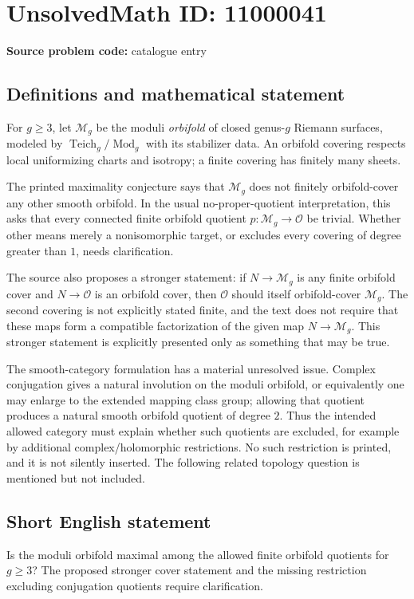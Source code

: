 \documentclass[11pt]{article}
\begin{document}
\section*{UnsolvedMath ID: 11000041}
\textbf{Source problem code:} catalogue entry
\subsection{Definitions and mathematical statement}
For \(g\geq3\), let \(\mathcal M_g\) be the moduli \emph{orbifold} of closed genus-\(g\) Riemann surfaces, modeled by \(\operatorname{Teich}_g/\operatorname{Mod}_g\) with its stabilizer data. An orbifold covering respects local uniformizing charts and isotropy; a finite covering has finitely many sheets.

The printed maximality conjecture says that \(\mathcal M_g\) does not finitely orbifold-cover any other smooth orbifold. In the usual no-proper-quotient interpretation, this asks that every connected finite orbifold quotient \(p:\mathcal M_g\to\mathcal O\) be trivial. Whether other means merely a nonisomorphic target, or excludes every covering of degree greater than \(1\), needs clarification.

The source also proposes a stronger statement: if \(N\to\mathcal M_g\) is any finite orbifold cover and \(N\to\mathcal O\) is an orbifold cover, then \(\mathcal O\) should itself orbifold-cover \(\mathcal M_g\). The second covering is not explicitly stated finite, and the text does not require that these maps form a compatible factorization of the given map \(N\to\mathcal M_g\). This stronger statement is explicitly presented only as something that may be true.

The smooth-category formulation has a material unresolved issue. Complex conjugation gives a natural involution on the moduli orbifold, or equivalently one may enlarge to the extended mapping class group; allowing that quotient produces a natural smooth orbifold quotient of degree \(2\). Thus the intended allowed category must explain whether such quotients are excluded, for example by additional complex/holomorphic restrictions. No such restriction is printed, and it is not silently inserted. The following related topology question is mentioned but not included.
\subsection{Short English statement}
Is the moduli orbifold maximal among the allowed finite orbifold quotients for \(g\geq3\)? The proposed stronger cover statement and the missing restriction excluding conjugation quotients require clarification.
\end{document}
